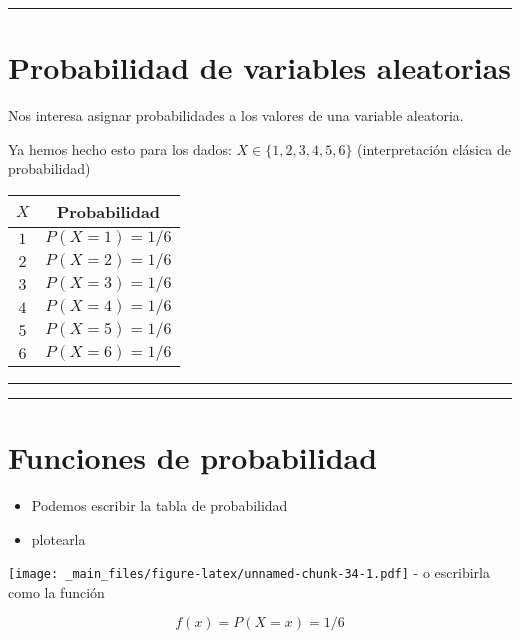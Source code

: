 \documentclass[
]{book}
\providecommand{\tightlist}{%
  \setlength{\itemsep}{0pt}\setlength{\parskip}{0pt}}
\begin{document}
\begin{center}\rule{0.5\linewidth}{0.5pt}\end{center}

\hypertarget{probabilidad-de-variables-aleatorias}{%
\section{Probabilidad de variables aleatorias}\label{probabilidad-de-variables-aleatorias}}

Nos interesa asignar probabilidades a los valores de una variable aleatoria.

Ya hemos hecho esto para los dados: \(X \in \{1,2,3,4,5,6\}\) (interpretación clásica de probabilidad)

\begin{longtable}[]{@{}cc@{}}
\toprule
\(X\) & Probabilidad \\
\midrule
\endhead
\(1\) & \(P(X=1)=1/6\) \\
\(2\) & \(P(X=2)=1/6\) \\
\(3\) & \(P(X=3)=1/6\) \\
\(4\) & \(P(X=4)=1/6\) \\
\(5\) & \(P(X=5)=1/6\) \\
\(6\) & \(P(X=6)=1/6\) \\
\bottomrule
\end{longtable}

\begin{center}\rule{0.5\linewidth}{0.5pt}\end{center}

\begin{center}\rule{0.5\linewidth}{0.5pt}\end{center}

\hypertarget{funciones-de-probabilidad}{%
\section{Funciones de probabilidad}\label{funciones-de-probabilidad}}

\begin{itemize}
\tightlist
\item
  Podemos escribir la tabla de probabilidad
\item
  plotearla
\end{itemize}

\texttt{[image: \_main\_files/figure-latex/unnamed-chunk-34-1.pdf]}
- o escribirla como la función

\[f(x)=P(X=x)=1/6\]
\end{document}
